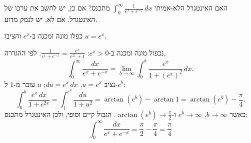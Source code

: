 
\begin{question}
האם האינטגרל הלא-אמיתי $\displaystyle\int_0^\infty\frac{1}{e^x+e^{-x}}\,dx$ מתכנס? אם כן, יש לחשב את ערכו של האינטגרל. אם לא, יש לנמק מדוע.
\end{question}

\begin{hint}
כפלו מונה ומכנה ב-$e^x$ והציבו $u=e^x$.
\end{hint}

\begin{solution}
נכפול מונה ומכנה ב-$e^x>0$: $\frac{1}{e^x+e^{-x}}=\frac{e^x}{e^{2x}+1}$. לפי ההגדרה,
\[ \int_0^\infty\frac{dx}{e^x+e^{-x}}=\lim_{b\to\infty}\int_0^b\frac{e^x}{1+(e^x)^2}\,dx. \]
נציב $u=e^x$, $du=e^x\,dx$; $u$ עובר מ-$1$ ל-$e^b$:
\[ \int_0^b\frac{e^x\,dx}{1+e^{2x}}=\int_1^{e^b}\frac{du}{1+u^2}=\arctan(e^b)-\arctan1=\arctan(e^b)-\frac\pi4. \]
כאשר $b\to\infty$, $e^b\to\infty$ ו-$\arctan(e^b)\to\frac\pi2$. הגבול קיים וסופי, ולכן האינטגרל מתכנס:
\[ \boxed{\int_0^\infty\frac{dx}{e^x+e^{-x}}=\frac\pi2-\frac\pi4=\frac\pi4} \]
\end{solution}
